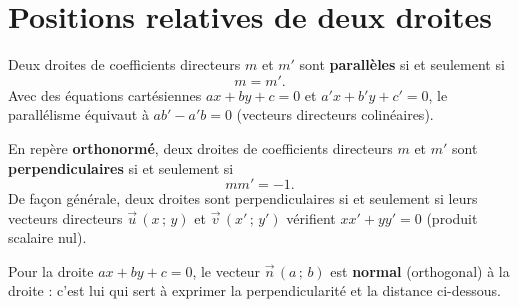 \begin{illus}
\end{illus}

\section{Positions relatives de deux droites}

\begin{theoreme}[Parallélisme]
Deux droites de coefficients directeurs $m$ et $m'$ sont \textbf{parallèles} si et
seulement si
\[ m=m'. \]
Avec des équations cartésiennes $ax+by+c=0$ et $a'x+b'y+c'=0$, le parallélisme
équivaut à $ab'-a'b=0$ (vecteurs directeurs colinéaires).
\end{theoreme}

\begin{theoreme}[Perpendicularité]
En repère \textbf{orthonormé}, deux droites de coefficients directeurs $m$ et $m'$
sont \textbf{perpendiculaires} si et seulement si
\[ mm'=-1. \]
De façon générale, deux droites sont perpendiculaires si et seulement si leurs
vecteurs directeurs $\vec{u}\,(x\,;\,y)$ et $\vec{v}\,(x'\,;\,y')$ vérifient
$xx'+yy'=0$ (produit scalaire nul).
\end{theoreme}

\begin{remarque}
Pour la droite $ax+by+c=0$, le vecteur $\vec{n}\,(a\,;\,b)$ est \textbf{normal}
(orthogonal) à la droite : c'est lui qui sert à exprimer la perpendicularité et la
distance ci-dessous.
\end{remarque}

